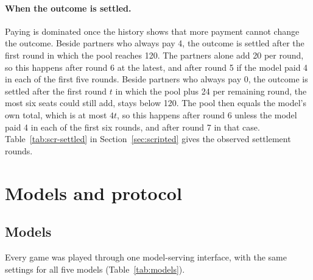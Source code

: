 \documentclass[10pt]{article}
\let\plainsubsection\subsection
\renewcommand{\subsection}{\FloatBarrier\needspace{8\baselineskip}\plainsubsection}
\let\plainsection\section
\renewcommand{\section}{\FloatBarrier\needspace{12\baselineskip}\plainsection}  %
\newcommand{\popt}{p^{*}}
\begin{document}
\begin{table}[h]
\caption{Best response of the model's seat to each kind of partner, found by trying every sequence of its own moves. Top: the best total over ten rounds. Bottom: the expected payoff it earns. Beside partners who always pay 2 or copy the group, any sequence that adds up to 20 is a best response above $\popt$.}
\label{tab:scr-best}
\centering\small

\end{table}

\paragraph{When the outcome is settled.} Paying is dominated once the history shows that more payment cannot change the outcome. Beside partners who always pay 4, the outcome is settled after the first round in which the pool reaches 120. The partners alone add 20 per round, so this happens after round 6 at the latest, and after round 5 if the model paid 4 in each of the first five rounds. Beside partners who always pay 0, the outcome is settled after the first round $t$ in which the pool plus 24 per remaining round, the most six seats could still add, stays below 120. The pool then equals the model's own total, which is at most $4t$, so this happens after round 6 unless the model paid 4 in each of the first six rounds, and after round 7 in that case. Table~\ref{tab:scr-settled} in Section~\ref{sec:scripted} gives the observed settlement rounds.

\section{Models and protocol}
\label{sec:models}

\subsection{Models}

Every game was played through one model-serving interface, with the same settings for all five models (Table~\ref{tab:models}).
\end{document}
